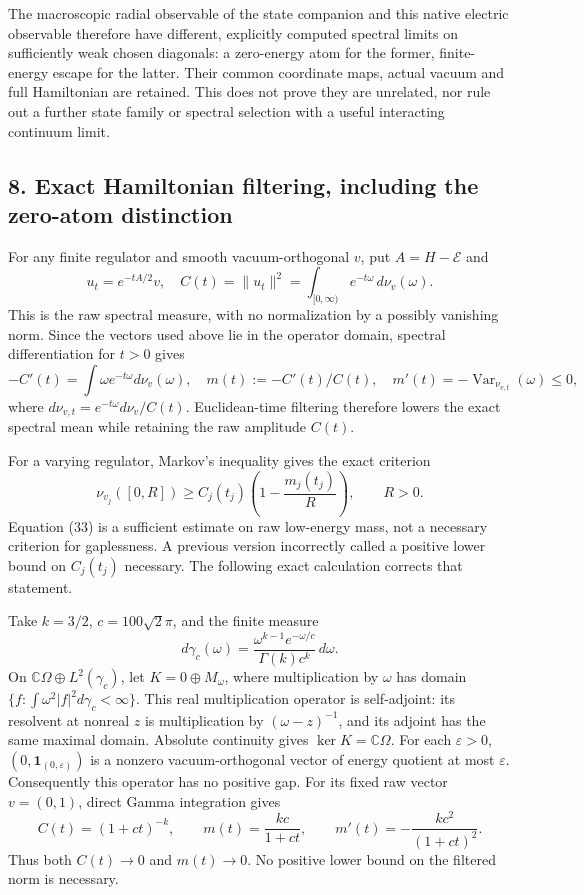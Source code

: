 \documentclass[
  11pt,
]{article}
\begin{document}
The macroscopic radial observable of the state companion and this native
electric observable therefore have different, explicitly computed
spectral limits on sufficiently weak chosen diagonals: a zero-energy
atom for the former, finite-energy escape for the latter. Their common
coordinate maps, actual vacuum and full Hamiltonian are retained. This
does not prove they are unrelated, nor rule out a further state family
or spectral selection with a useful interacting continuum limit.

\subsection{8. Exact Hamiltonian filtering, including the zero-atom
distinction}\label{weak-coupling-part-3-exact-hamiltonian-filtering-including-the-zero-atom-distinction}

For any finite regulator and smooth vacuum-orthogonal \(v\), put
\(A=H-\mathcal E\) and \[
 u_t=e^{-tA/2}v,\quad
 C(t)=\|u_t\|^2=\int_{[0,\infty)}e^{-t\omega}\,d\nu_v(\omega).
\tag{31}
\] This is the raw spectral measure, with no normalization by a possibly
vanishing norm. Since the vectors used above lie in the operator domain,
spectral differentiation for \(t>0\) gives \[
 -C'(t)=\int\omega e^{-t\omega}d\nu_v(\omega),\quad
 m(t):=-C'(t)/C(t),\quad
 m'(t)=-\operatorname{Var}_{\nu_{v,t}}(\omega)\le0,
\tag{32}
\] where \(d\nu_{v,t}=e^{-t\omega}d\nu_v/C(t)\). Euclidean-time
filtering therefore lowers the exact spectral mean while retaining the
raw amplitude \(C(t)\).

For a varying regulator, Markov's inequality gives the exact criterion
\[
 \nu_{v_j}([0,R])\ge C_j(t_j)\left(1-\frac{m_j(t_j)}R\right),
 \qquad R>0.\tag{33}
\] Equation (33) is a sufficient estimate on raw low-energy mass, not a
necessary criterion for gaplessness. A previous version incorrectly
called a positive lower bound on \(C_j(t_j)\) necessary. The following
exact calculation corrects that statement.

Take \(k=3/2\), \(c=100\sqrt2\pi\), and the finite measure \[
 d\gamma_c(\omega)=
 \frac{\omega^{k-1}e^{-\omega/c}}{\Gamma(k)c^k}\,d\omega.
\] On \(\mathbb C\Omega\oplus L^2(\gamma_c)\), let
\(K=0\oplus M_\omega\), where multiplication by \(\omega\) has domain
\(\{f:\int\omega^2|f|^2d\gamma_c<\infty\}\). This real multiplication
operator is self-adjoint: its resolvent at nonreal \(z\) is
multiplication by \((\omega-z)^{-1}\), and its adjoint has the same
maximal domain. Absolute continuity gives \(\ker K=\mathbb C\Omega\).
For each \(\varepsilon>0\), \((0,\mathbf1_{(0,\varepsilon)})\) is a
nonzero vacuum-orthogonal vector of energy quotient at most
\(\varepsilon\). Consequently this operator has no positive gap. For its
fixed raw vector \(v=(0,1)\), direct Gamma integration gives \[
 C(t)=(1+ct)^{-k},\qquad
 m(t)=\frac{kc}{1+ct},\qquad
 m'(t)=-\frac{kc^2}{(1+ct)^2}.
\] Thus both \(C(t)\to0\) and \(m(t)\to0\). No positive lower bound on
the filtered norm is necessary.
\end{document}
